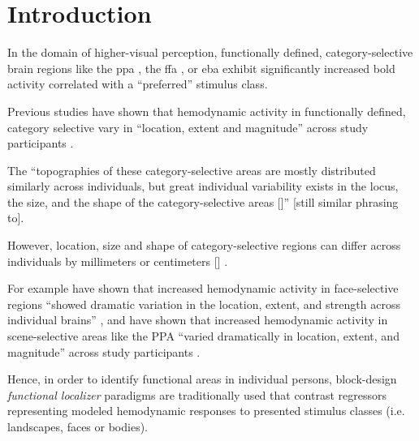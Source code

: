 
\section{Introduction}

In the domain of higher-visual perception, functionally defined,
category-selective brain regions like the \ac{ppa} \citep{epstein1998ppa}, the
\ac{ffa} \citep{kanwisher1997ffa}, or \ac{eba} \citep{downing2001bodyarea}
exhibit significantly increased \ac{bold} activity correlated with a
``preferred'' \citep{debeck2008interpreting} stimulus class.


Previous studies have shown that hemodynamic activity in functionally defined,
category selective vary in ``location, extent and magnitude'' across study
participants \citep{rosenke2021probabilistic, frost2012measuring,
zhen2017quantifying, zhen2015quantifying}.

The ``topographies of these category-selective areas are mostly distributed
similarly across individuals, but great individual variability exists in the
locus, the size, and the shape of the category-selective areas
[\citep{rosenke2021probabilistic, zhen2017quantifying, zhen2015quantifying,
frost2012measuring}]'' [still similar phrasing to\citep{jiahui2020predicting}].

However, location, size and shape of category-selective regions can differ
across individuals by millimeters or centimeters [\citep{zhen2017quantifying,
zhen2015quantifying}] \citep{feilong2018reliable}.



For example \citet{zhen2015quantifying} have shown that increased hemodynamic
activity in face-selective regions ``showed dramatic variation in the location,
extent, and strength across individual brains'' \citep{zhen2015quantifying}, and
\citet{zhen2017quantifying} have shown that increased hemodynamic activity in
scene-selective areas like the PPA ``varied dramatically in location, extent,
and magnitude'' across study participants \citep{zhen2017quantifying}.

Hence, in order to identify functional areas in individual persons, block-design
\textit{functional localizer} paradigms are traditionally used that contrast
regressors representing modeled hemodynamic responses to presented stimulus
classes (i.e. landscapes, faces or bodies).



